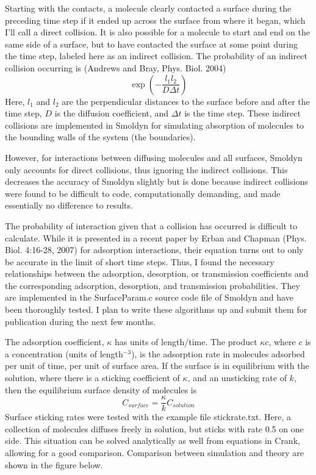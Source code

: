 \documentclass {book}
\begin{document}
Starting with the contacts, a molecule clearly contacted a surface during the preceding time step if it ended up across the surface from where it began, which I'll call a direct collision. It is also possible for a molecule to start and end on the same side of a surface, but to have contacted the surface at some point during the time step, labeled here as an indirect collision. The probability of an indirect collision occurring is (Andrews and Bray, Phys. Biol. 2004)
$$\exp\left({-\frac{l_1l_2}{D \Delta t}} \right)$$
Here, $l_1$ and $l_2$ are the perpendicular distances to the surface before and after the time step, $D$ is the diffusion coefficient, and $\Delta t$ is the time step. These indirect collisions are implemented in Smoldyn for simulating absorption of molecules to the bounding walls of the system (the boundaries).

However, for interactions between diffusing molecules and all surfaces, Smoldyn only accounts for direct collisions, thus ignoring the indirect collisions. This decreases the accuracy of Smoldyn slightly but is done because indirect collisions were found to be difficult to code, computationally demanding, and made essentially no difference to results.

The probability of interaction given that a collision has occurred is difficult to calculate. While it is presented in a recent paper by Erban and Chapman (Phys. Biol. 4:16-28, 2007) for adsorption interactions, their equation turns out to only be accurate in the limit of short time steps. Thus, I found the necessary relationships between the adsorption, desorption, or transmission coefficients and the corresponding adsorption, desorption, and transmission probabilities. They are implemented in the SurfaceParam.c source code file of Smoldyn and have been thoroughly tested. I plan to write these algorithms up and submit them for publication during the next few months.

The adsorption coefficient, $\kappa$ has units of length/time. The product $\kappa c$, where $c$ is a concentration (units of length$^{-3}$), is the adsorption rate in molecules adsorbed per unit of time, per unit of surface area. If the surface is in equilibrium with the solution, where there is a sticking coefficient of $\kappa$, and an unsticking rate of $k$, then the equilibrium surface density of molecules is
$$C_{surface} = \frac{\kappa}{k} C_{solution}$$
Surface sticking rates were tested with the example file stickrate.txt. Here, a collection of molecules diffuses freely in solution, but sticks with rate 0.5 on one side. This situation can be solved analytically as well from equations in Crank, allowing for a good comparison. Comparison between simulation and theory are shown in the figure below.
\end{document}
